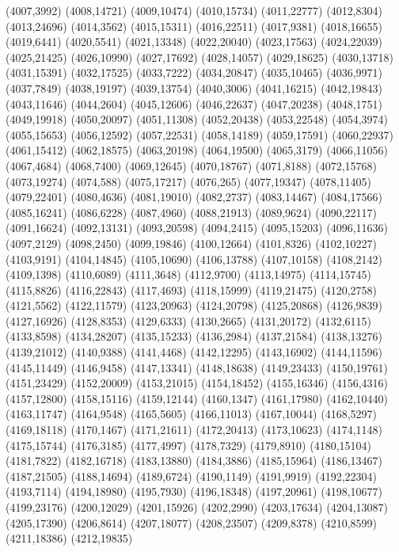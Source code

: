 (4007,3992)
(4008,14721)
(4009,10474)
(4010,15734)
(4011,22777)
(4012,8304)
(4013,24696)
(4014,3562)
(4015,15311)
(4016,22511)
(4017,9381)
(4018,16655)
(4019,6441)
(4020,5541)
(4021,13348)
(4022,20040)
(4023,17563)
(4024,22039)
(4025,21425)
(4026,10990)
(4027,17692)
(4028,14057)
(4029,18625)
(4030,13718)
(4031,15391)
(4032,17525)
(4033,7222)
(4034,20847)
(4035,10465)
(4036,9971)
(4037,7849)
(4038,19197)
(4039,13754)
(4040,3006)
(4041,16215)
(4042,19843)
(4043,11646)
(4044,2604)
(4045,12606)
(4046,22637)
(4047,20238)
(4048,1751)
(4049,19918)
(4050,20097)
(4051,11308)
(4052,20438)
(4053,22548)
(4054,3974)
(4055,15653)
(4056,12592)
(4057,22531)
(4058,14189)
(4059,17591)
(4060,22937)
(4061,15412)
(4062,18575)
(4063,20198)
(4064,19500)
(4065,3179)
(4066,11056)
(4067,4684)
(4068,7400)
(4069,12645)
(4070,18767)
(4071,8188)
(4072,15768)
(4073,19274)
(4074,588)
(4075,17217)
(4076,265)
(4077,19347)
(4078,11405)
(4079,22401)
(4080,4636)
(4081,19010)
(4082,2737)
(4083,14467)
(4084,17566)
(4085,16241)
(4086,6228)
(4087,4960)
(4088,21913)
(4089,9624)
(4090,22117)
(4091,16624)
(4092,13131)
(4093,20598)
(4094,2415)
(4095,15203)
(4096,11636)
(4097,2129)
(4098,2450)
(4099,19846)
(4100,12664)
(4101,8326)
(4102,10227)
(4103,9191)
(4104,14845)
(4105,10690)
(4106,13788)
(4107,10158)
(4108,2142)
(4109,1398)
(4110,6089)
(4111,3648)
(4112,9700)
(4113,14975)
(4114,15745)
(4115,8826)
(4116,22843)
(4117,4693)
(4118,15999)
(4119,21475)
(4120,2758)
(4121,5562)
(4122,11579)
(4123,20963)
(4124,20798)
(4125,20868)
(4126,9839)
(4127,16926)
(4128,8353)
(4129,6333)
(4130,2665)
(4131,20172)
(4132,6115)
(4133,8598)
(4134,28207)
(4135,15233)
(4136,2984)
(4137,21584)
(4138,13276)
(4139,21012)
(4140,9388)
(4141,4468)
(4142,12295)
(4143,16902)
(4144,11596)
(4145,11449)
(4146,9458)
(4147,13341)
(4148,18638)
(4149,23433)
(4150,19761)
(4151,23429)
(4152,20009)
(4153,21015)
(4154,18452)
(4155,16346)
(4156,4316)
(4157,12800)
(4158,15116)
(4159,12144)
(4160,1347)
(4161,17980)
(4162,10440)
(4163,11747)
(4164,9548)
(4165,5605)
(4166,11013)
(4167,10044)
(4168,5297)
(4169,18118)
(4170,1467)
(4171,21611)
(4172,20413)
(4173,10623)
(4174,1148)
(4175,15744)
(4176,3185)
(4177,4997)
(4178,7329)
(4179,8910)
(4180,15104)
(4181,7822)
(4182,16718)
(4183,13880)
(4184,3886)
(4185,15964)
(4186,13467)
(4187,21505)
(4188,14694)
(4189,6724)
(4190,1149)
(4191,9919)
(4192,22304)
(4193,7114)
(4194,18980)
(4195,7930)
(4196,18348)
(4197,20961)
(4198,10677)
(4199,23176)
(4200,12029)
(4201,15926)
(4202,2990)
(4203,17634)
(4204,13087)
(4205,17390)
(4206,8614)
(4207,18077)
(4208,23507)
(4209,8378)
(4210,8599)
(4211,18386)
(4212,19835)
